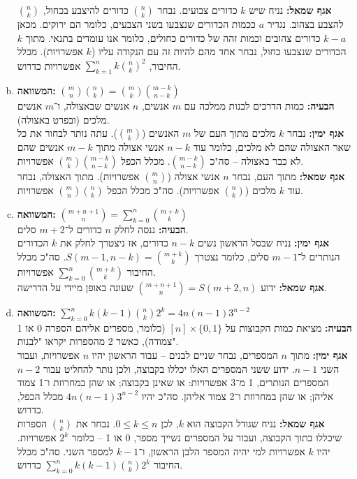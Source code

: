 \documentclass[]{article}
\newcommand\sumnk {\sum_{k = 0}^{n}}
\begin{document}
\begin{enumerate}[(a)]
		\textbf{אגף שמאל: }נניח שיש $k$ כדורים צבועים. נבחר $\binom{n}{k}$ כדורים להיצבע בכחול, $\binom{n}{k}$ להצבע בצהוב. נגדיר $a$  ככמות הכדורים שנצבעו בשני הצבעים, כלומר הם ירוקים. מכאן $k - a$ כדורים צהובים וכמות זהה של כדורים כחולים, כלומר אנו עומדים בתנאי. מתוך $k$ הכדורים שנצבעו כחול, נבחר אחד מהם להיות זה עם הנקודה עליו ($k$ אפשרויות). מכלל החיבור, $\sum_{k = 1}^{n}k\binom{n}{k}^2$ אפשרויות כדרוש. 
		\item \textbf{המשוואה: }$\binom{m}{n}\binom{n}{k} = \binom{m}{k}\binom{m - k}{n - k}$ \\
		\textbf{הבעיה: }כמות הדרכים לבנות ממלכה עם $m$ אנשים, $n$ אנשים שבאצולה, ו־$m$ אנשים מלכים (ובפרט באצולה).  \\
		\textbf{אגף ימין: }נבחר $k$ מלכים מתוך העם של $m$ האנשים ($\binom{m}{k}$). עתה נותר לבחור את כל שאר האצולה שהם לא מלכים, כלומר עוד $n - k$ אנשי אצולה מתוך $m - k$ אנשים שהם לא כבר באצולה – סה"כ $\binom{m - k}{n - k}$. מכלל הכפל $\binom{m}{k}\binom{m - k}{n - k}$ אפשרויות.  \\
		\textbf{אגף שמאל: }מתוך העם, נבחר $n$ אנשי אצולה ($\binom{m}{n}$ אפשרויות). מתוך האצולה, נבחר עוד $k$ מלכים ($\binom{n}{k}$ אפשרויות). סה"כ מכלל הכפל $\binom{m}{n}\binom{n}{k}$ אפשרויות. 
		\item \textbf{המשוואה: }$\binom{m + n + 1}{n} = \sum_{k = 0}^{n}\binom{m + k}{k}$ \\
		\textbf{הבעיה: }ננסה לחלק $n$ כדורים ל־$m + 2$ סלים. \\
		\textbf{אגף ימין: }נניח שבסל הראשון נשים $n - k$ כדורים, אז ניצטרך לחלק את $k$ הכדורים הנותרים ל־$m - 1$ סלים, כלומר נצטרך $S(m - 1, n - k) = \binom{m + k}{k}$. סה"כ מכלל החיבור $\sumnk \binom{m + k}{k}$ אפשרויות. \\
		\textbf{אגף שמאל: }ידוע $\binom{m + n + 1}{n} = S(m + 2, n)$ שעונה באופן מיידי על הדרישה. 
		\item \textbf{המשוואה: }$\sum_{k = 0}^{n}k(k - 1)\binom{n}{k}2^k = 4n(n - 1)3^{n - 2}$ \\
		\textbf{הבעיה: }מציאת כמות הקבוצות על $[n] \times \{0, 1\}$ (כלומר, מספרים אליהם הספרה 0 או 1 צמודה), כאשר 2 מהספרות יקראו "לבנות". \\
			\textbf{אגף ימין: }
			 מתוך $n$ המספרים, נבחר שניים לבנים – עבור הראשון יהיו $n$ אפשרויות, ועבור השני $n - 1$. ידוע ששני המספרים האלו יכללו בקבוצה, ולכן נותר להחליט עבור $n - 2$ המספרים הנותרים, 1 מ־3 אפשרויות: או שאינן בקבוצה; או שהן במחרוזת ו־1 צמוד אליהן; או שהן במחרוזת ו־2 צמוד אליהן. 
			 סה"כ יהיו $ 4n(n - 1)3^{n - 2} $ מכלל הכפל, כדרוש. \\
		\textbf{אגף שמאל: } נניח שגודל הקבוצה הוא $k$, 
		לכן $0 \le k \le n$. נבחר את $\binom{n}{k}$ הספרות שיכללו בתוך הקבוצה, ועבור על המספרים נשייך מספר, 0 או 1 – כלומר $2^k$ אפשרויות. יהיו $k$ אפשרויות למי יהיה המספר הלבן הראשון, ו־$k - 1 $ למספר השני. סה"כ מכלל החיבור $\sum_{k = 0}^{n}k(k - 1)\binom{n}{k}2^k$ כדרוש. 
	\end{enumerate}
\end{document}

